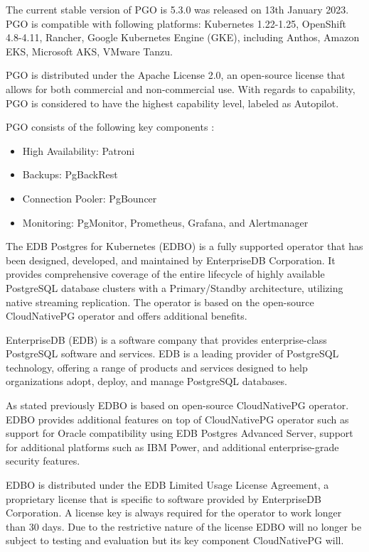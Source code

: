 The current stable version of PGO is 5.3.0 was released on 13th January 2023. \cite{ArtifactHubCrunchy}
PGO is compatible with following platforms: Kubernetes 1.22-1.25, OpenShift 4.8-4.11, Rancher, Google Kubernetes Engine (GKE), including Anthos, Amazon EKS, Microsoft AKS, VMware Tanzu. \cite{CrunchyDoc}

PGO is distributed under the Apache License 2.0, an open-source license that allows for both commercial and non-commercial use. With regards to capability, PGO is considered to have the highest capability level, labeled as Autopilot. \cite{OperatorHubCrunchy}

PGO consists of the following key components \cite{CrunchyPGOGit}:
\begin{itemize}
  \item High Availability: Patroni
  \item Backups: PgBackRest
  \item Connection Pooler: PgBouncer
  \item Monitoring: PgMonitor, Prometheus, Grafana, and Alertmanager
\end{itemize}


\pagebreak
{}
The EDB Postgres for Kubernetes (EDBO) is a fully supported operator that has been designed, developed, and maintained by EnterpriseDB Corporation. It provides comprehensive coverage of the entire lifecycle of highly available PostgreSQL database clusters with a Primary/Standby architecture, utilizing native streaming replication. The operator is based on the open-source CloudNativePG operator and offers additional benefits. \cite{OperatorHubEDB}

EnterpriseDB (EDB) is a software company that provides enterprise-class PostgreSQL software and services. EDB is a leading provider of PostgreSQL technology, offering a range of products and services designed to help organizations adopt, deploy, and manage PostgreSQL databases. \cite{EDB}

As stated previously EDBO is based on open-source CloudNativePG operator. EDBO provides additional features on top of CloudNativePG operator such as support for Oracle compatibility using EDB Postgres Advanced Server, support for additional platforms such as IBM Power, and additional enterprise-grade security features. \cite{EDBdocu}

EDBO is distributed under the EDB Limited Usage License Agreement, a proprietary license that is specific to software provided by EnterpriseDB Corporation. A license key is always required for the operator to work longer than 30 days. \cite{EDBdocuLicence} Due to the restrictive nature of the license EDBO will no longer be subject to testing and evaluation but its key component CloudNativePG will.

